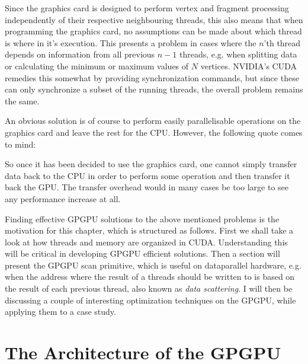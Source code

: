 Since the graphics card is designed to perform vertex and fragment
processing independently of their respective neighbouring threads,
this also means that when programming the graphics card, no
assumptions can be made about which thread is where in it's
execution. This presents a problem in cases where the $n$'th thread
depends on information from all previous $n-1$ threads, e.g. when
splitting data or calculating the minimum or maximum values of $N$
vertices. NVIDIA's CUDA remedies this somewhat by providing
synchronization commands, but since these can only synchronize a
subset of the running threads, the overall problem remains the same.


An obvious solution is of course to perform easily parallelisable
operations on the graphics card and leave the rest for the
CPU. However, the following quote comes to mind:


So once it has been decided to use the graphics card, one cannot
simply transfer data back to the CPU in order to perform some
operation and then transfer it back the GPU. The transfer overhead
would in many cases be too large to see any performance increase at
all.




Finding effective GPGPU solutions to the above mentioned problems is
the motivation for this chapter, which is structured as follows.
First we shall take a look at how threads and memory are organized in
CUDA. Understanding this will be critical in developing GPGPU
efficient solutions. Then a section will present the GPGPU scan
primitive, which is useful on dataparallel hardware, e.g. when the
address where the result of a threads should be written to is based on
the result of each previous thread, also known as \textit{data
  scattering}. I will then be discussing a couple of interesting
optimization techniques on the GPGPU, while applying them to a case
study.

\section{The Architecture of the GPGPU}

